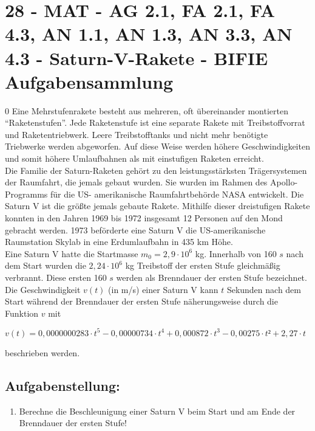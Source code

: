\section{28 - MAT - AG 2.1, FA 2.1, FA 4.3, AN 1.1, AN 1.3, AN 3.3, AN 4.3 - Saturn-V-Rakete - BIFIE Aufgabensammlung}

\begin{langesbeispiel} \item[0] %
				Eine Mehrstufenrakete besteht aus mehreren, oft übereinander montierten "`Raketenstufen"'. Jede Raketenstufe ist eine separate Rakete mit Treibstoffvorrat und Raketentriebwerk. Leere Treibstofftanks und nicht mehr benötigte Triebwerke werden abgeworfen. Auf diese Weise werden höhere Geschwindigkeiten und somit höhere Umlaufbahnen als mit einstufigen Raketen erreicht.\\
Die Familie der Saturn-Raketen gehört zu den leistungsstärksten Trägersystemen der Raumfahrt, die jemals gebaut wurden. Sie wurden im Rahmen des Apollo-Programms für die US-
amerikanische Raumfahrtbehörde NASA entwickelt. Die Saturn V ist die größte jemals gebaute
Rakete. Mithilfe dieser dreistufigen Rakete konnten in den Jahren 1969 bis 1972 insgesamt
12 Personen auf den Mond gebracht werden. 1973 beförderte eine Saturn V die US-amerikanische Raumstation Skylab in eine Erdumlaufbahn in 435 km Höhe.\\
Eine Saturn V hatte die Startmasse $m_0=2,9\cdot 10^6$ kg. Innerhalb von 160 $s$ nach dem Start
wurden die $2,24\cdot 10^6$ kg Treibstoff der ersten Stufe gleichmäßig verbrannt. Diese ersten 160 $s$ werden als Brenndauer der ersten Stufe bezeichnet. Die Geschwindigkeit $v(t)$ (in m/s) einer Saturn V kann $t$ Sekunden nach dem Start während der Brenndauer der ersten Stufe näherungsweise durch die Funktion $v$ mit

\begin{center}
	$v(t)=0,0000000283\cdot t^5-0,00000734\cdot t^4+0,000872\cdot t^3-0,00275\cdot t²+2,27\cdot t$\end{center}
	
	beschrieben werden.


\subsection{Aufgabenstellung:}
\begin{enumerate}
	\item Berechne die Beschleunigung einer Saturn V beim Start und am Ende der Brenndauer der ersten Stufe!
	

\end{enumerate}
\end{langesbeispiel}
